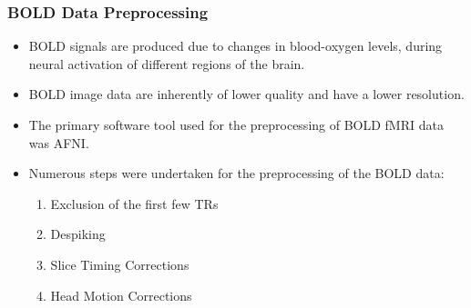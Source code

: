 \documentclass{beamer}
\begin{document}
  \begin{frame}[t]
    \frametitle{BOLD Data Preprocessing}

    \begin{itemize}

      \item BOLD signals are produced due to changes in blood-oxygen
        levels, during neural activation of different regions of the
        brain. \vskip 10pt

      \item BOLD image data are inherently of lower quality and
        have a lower resolution. \vskip 10pt

      \item  The primary software tool used for the preprocessing of
        BOLD fMRI data was AFNI. \vskip 10pt

      \item Numerous steps were undertaken for the preprocessing of
        the BOLD data:

        \begin{enumerate}
          \item Exclusion of the first few TRs
          \item Despiking
          \item Slice Timing Corrections
          \item Head Motion Corrections
        \end{enumerate} \vskip 10pt


    \end{itemize}

  \end{frame}
\end{document}
